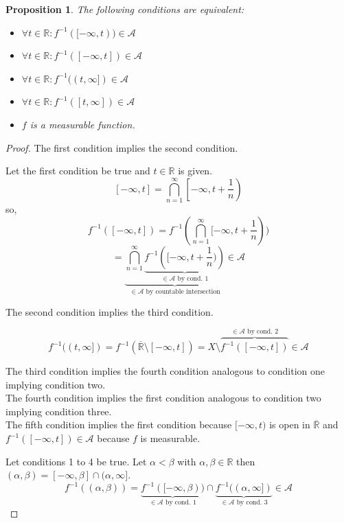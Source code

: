 \documentclass{article}
\newtheorem{proposition}{Proposition}  \numberwithin{proposition}{section}
\begin{document}
\begin{proposition}
  The following conditions are equivalent:
  \begin{itemize}
    \item $\forall t \in \mathbb R: f^{-1}([-\infty, t)) \in \mathcal A$
    \item $\forall t \in \mathbb R: f^{-1}([-\infty, t]) \in \mathcal A$
    \item $\forall t \in \mathbb R: f^{-1}((t, \infty]) \in \mathcal A$
    \item $\forall t \in \mathbb R: f^{-1}([t, \infty]) \in \mathcal A$
    \item $f$ is a measurable function.
  \end{itemize}
\end{proposition}
\begin{proof}
  The first condition implies the second condition.

  Let the first condition be true and $t \in \mathbb R$ is given.
  \[ [-\infty, t] = \bigcap_{n=1}^\infty \left[-\infty, t + \frac1n\right) \]
  so,
  \[ f^{-1}([-\infty, t]) = f^{-1}(\bigcap_{n=1}^\infty [-\infty, t + \frac1n)) \]
  \[ = \underbrace{\bigcap_{n=1}^\infty \underbrace{f^{-1}\left([-\infty, t + \frac1n)\right)}_{\in \mathcal A \text{ by cond. 1}}}_{\in \mathcal A \text{ by countable intersection}} \in \mathcal A \]

  The second condition implies the third condition.

  \[
    f^{-1}((t, \infty])
    = f^{-1}(\overline{\mathbb R} \setminus [-\infty, t])
    = X \setminus \overbrace{f^{-1}([-\infty, t])}^{\in \mathcal A \text{ by cond. 2}} \in \mathcal A
  \]

  The third condition implies the fourth condition analogous to condition one implying condition two. \\
  The fourth condition implies the first condition analogous to condition two implying condition three. \\

  The fifth condition implies the first condition because $[-\infty, t)$ is open in $\overline{\mathbb R}$ and $f^{-1}([-\infty, t]) \in \mathcal A$ because $f$ is measurable.

  Let conditions 1 to 4 be true. Let $\alpha < \beta$ with $\alpha, \beta \in \mathbb R$ then $(\alpha, \beta) = [-\infty, \beta] \cap (\alpha, \infty]$.
  \[ f^{-1}((\alpha, \beta)) = \underbrace{f^{-1}([-\infty, \beta))}_{\in \mathcal A \text{ by cond. 1}} \cap \underbrace{f^{-1}((\alpha, \infty])}_{\in \mathcal A \text{ by cond. 3}} \in \mathcal A \]


\end{proof}
\end{document}
